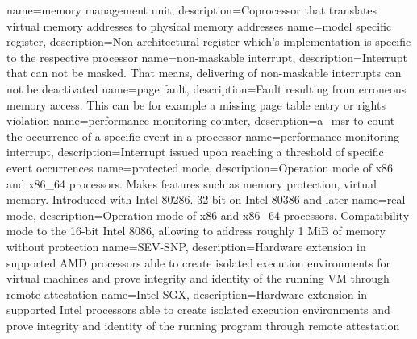 %
{
    name=memory management unit,
    description={Coprocessor that translates virtual memory addresses to physical memory addresses}
}
{
    name=model specific register,
    description={Non-architectural register which's implementation is specific to the respective processor}
}
%
{
    name=non-maskable interrupt,
    description={Interrupt that can not be masked. That means, delivering of non-maskable interrupts can not be
            deactivated}
}
%
{
    name=page fault,
    description={Fault resulting from erroneous memory access. This can be for example a missing page table entry or
            rights violation }
}
{
    name=performance monitoring counter,
    description={\acrshort{a_msr} to count the occurrence of a specific event in a processor}
}
{
    name=performance monitoring interrupt,
    description={Interrupt issued upon reaching a threshold of specific event occurrences}
}
{
    name=protected mode,
    description={Operation mode of x86 and x86\_64 processors. Makes features such as memory protection, virtual memory.
            Introduced with Intel 80286. 32-bit on Intel 80386 and later}
}
%
{
    name=real mode,
    description={Operation mode of x86 and x86\_64 processors. Compatibility mode to the 16-bit Intel 8086, allowing to
            address roughly 1 MiB of memory without protection}
}
%
{
    name=SEV-SNP,
    description={Hardware extension in supported AMD processors able to create isolated execution environments for
            virtual machines and prove integrity and identity of the running VM through remote attestation}
}
{
    name=Intel SGX,
    description={Hardware extension in supported Intel processors able to create isolated execution environments and
            prove integrity and identity of the running program through remote attestation}
}
